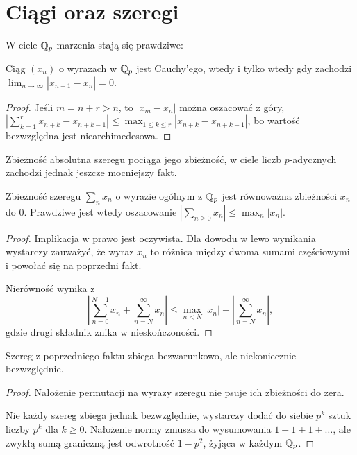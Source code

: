 \section{Ciągi oraz szeregi}
W ciele $\mathbb Q_p$ marzenia stają się prawdziwe:

\begin{fakt}
	Ciąg $(x_n)$ o wyrazach w $\mathbb Q_p$ jest Cauchy'ego, wtedy i tylko wtedy gdy zachodzi $\lim_{n\to \infty}|x_{n+1} - x_n| = 0$.
\end{fakt}

\begin{proof}
	Jeśli $m = n+r > n$, to $|x_m - x_n|$ można oszacować z góry,
	$\left|\sum_{k = 1}^r x_{n+k} - x_{n+k-1}\right| \le \max_{1 \le k \le r} |x_{n+k}-x_{n+k-1}|$,
	bo wartość bezwzględna jest niearchimedesowa.
\end{proof}

Zbieżność absolutna szeregu pociąga jego zbieżność, w ciele liczb $p$-adycznych zachodzi jednak jeszcze mocniejszy fakt.

\begin{fakt} \label{ingentis} %
	Zbieżność szeregu $\sum_n x_n$ o wyrazie ogólnym z $\mathbb Q_p$ jest równoważna zbieżności $x_n$ do $0$.
	Prawdziwe jest wtedy oszacowanie $|\sum_{n \ge 0} x_n| \le \max_n |x_n|$.
\end{fakt}

\begin{proof}
	Implikacja w prawo jest oczywista.
	Dla dowodu w lewo wynikania wystarczy zauważyć, że wyraz $x_n$ to różnica między dwoma sumami częściowymi i powołać się na poprzedni fakt.

	Nierówność wynika z
	\[
		\left|\sum_{n = 0}^{N-1} x_n + \sum_{n = N}^\infty x_n\right| \le \max_{n < N} |x_n| + \left|\sum_{n = N}^\infty x_n\right|,
	\] gdzie drugi składnik znika w nieskończoności.
\end{proof}

\begin{wniosek}
	Szereg z poprzedniego faktu zbiega bezwarunkowo, ale niekoniecznie bezwzględnie.
\end{wniosek}

\begin{proof}
	Nałożenie permutacji na wyrazy szeregu nie psuje ich zbieżności do zera.

	Nie każdy szereg zbiega jednak bezwzględnie, wystarczy dodać do siebie $p^k$ sztuk liczby $p^k$ dla $k \ge 0$.
	Nałożenie normy zmusza do wysumowania $1 + 1 + 1 + \ldots$, ale zwykłą sumą graniczną jest odwrotność $1 - p^2$, żyjąca w każdym $\mathbb Q_p$.
\end{proof}

